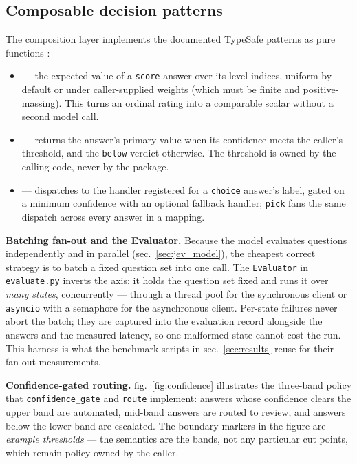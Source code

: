 \documentclass[
  english,
]{article}
\providecommand{\tightlist}{%
  \setlength{\itemsep}{0pt}\setlength{\parskip}{0pt}}
\begin{document}
\subsection{Composable decision
patterns}\label{composable-decision-patterns}

The composition layer implements the documented TypeSafe patterns as
pure functions \citep{typesafe2026patterns}:

\begin{itemize}
\tightlist
\item
  \textbf{} --- the
  expected value of a \texttt{score} answer over its level indices,
  uniform by default or under caller-supplied weights (which must be
  finite and positive-massing). This turns an ordinal rating into a
  comparable scalar without a second model call.
\item
  \textbf{} ---
  returns the answer's primary value when its confidence meets the
  caller's threshold, and the \texttt{below} verdict otherwise. The
  threshold is owned by the calling code, never by the package.
\item
  \textbf{}
  --- dispatches to the handler registered for a \texttt{choice}
  answer's label, gated on a minimum confidence with an optional
  fallback handler; \texttt{pick} fans the same dispatch across every
  answer in a mapping.
\end{itemize}

\textbf{Batching fan-out and the Evaluator.} Because the model evaluates
questions independently and in parallel (sec.~\ref{sec:jev_model}), the
cheapest correct strategy is to batch a fixed question set into one
call. The \texttt{Evaluator} in \texttt{evaluate.py} inverts the axis:
it holds the question set fixed and runs it over \emph{many states},
concurrently --- through a thread pool for the synchronous client or
\texttt{asyncio} with a semaphore for the asynchronous client. Per-state
failures never abort the batch; they are captured into the evaluation
record alongside the answers and the measured latency, so one malformed
state cannot cost the run. This harness is what the benchmark scripts in
sec.~\ref{sec:results} reuse for their fan-out measurements.

\textbf{Confidence-gated routing.} fig.~\ref{fig:confidence} illustrates
the three-band policy that \texttt{confidence\_gate} and \texttt{route}
implement: answers whose confidence clears the upper band are automated,
mid-band answers are routed to review, and answers below the lower band
are escalated. The boundary markers in the figure are \emph{example
thresholds} --- the semantics are the bands, not any particular cut
points, which remain policy owned by the caller.
\end{document}
